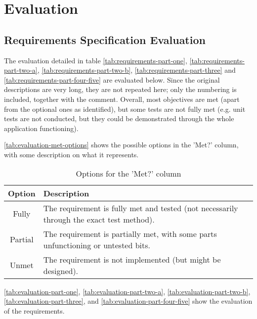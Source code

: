 \chapter{Evaluation}
\section{Requirements Specification Evaluation}

The evaluation detailed in table \autoref{tab:requirements-part-one}, \autoref{tab:requirements-part-two-a}, \autoref{tab:requirements-part-two-b}, \autoref{tab:requirements-part-three} and \autoref{tab:requirements-part-four-five} are evaluated below. Since the original descriptions are very long, they are not repeated here; only the numbering is included, together with the comment. Overall, most objectives are met (apart from the optional ones as identified), but some tests are not fully met (e.g. unit tests are not conducted, but they could be demonstrated through the whole application functioning).

\autoref{tab:evaluation-met-options} shows the possible options in the 'Met?' column, with some description on what it represents.

\begin{table}[htp]
    \centering
    \begin{tabular}{cp{30em}}
        Option  & Description                                                                              \\
        \hline
        Fully   & The requirement is fully met and tested (not necessarily through the exact test method). \\
        Partial & The requirement is partially met, with some parts unfunctioning or untested bits.        \\
        Unmet   & The requirement is not implemented (but might be designed).
    \end{tabular}
    \caption{Options for the 'Met?' column}
    \label{tab:evaluation-met-options}
\end{table}

\autoref{tab:evaluation-part-one}, \autoref{tab:evaluation-part-two-a}, \autoref{tab:evaluation-part-two-b}, \autoref{tab:evaluation-part-three}, and \autoref{tab:evaluation-part-four-five} show the evaluation of the requirements.

